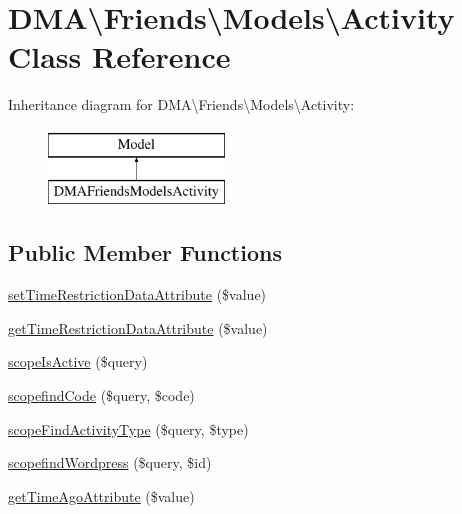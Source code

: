 \hypertarget{classDMA_1_1Friends_1_1Models_1_1Activity}{}\section{D\+M\+A\textbackslash{}Friends\textbackslash{}Models\textbackslash{}Activity Class Reference}
\label{classDMA_1_1Friends_1_1Models_1_1Activity}
Inheritance diagram for D\+M\+A\textbackslash{}Friends\textbackslash{}Models\textbackslash{}Activity\+:\begin{figure}[H]
\begin{center}
\leavevmode
\includegraphics[height=2.000000cm]{dc/d8c/classDMA_1_1Friends_1_1Models_1_1Activity}
\end{center}
\end{figure}
\subsection*{Public Member Functions}
\begin{DoxyCompactItemize}
\item 
\hyperlink{classDMA_1_1Friends_1_1Models_1_1Activity_ade0ffca24448c217def365d104e52866}{set\+Time\+Restriction\+Data\+Attribute} (\$value)
\item 
\hyperlink{classDMA_1_1Friends_1_1Models_1_1Activity_a98a904c739aca30f2a26152a481164b6}{get\+Time\+Restriction\+Data\+Attribute} (\$value)
\item 
\hyperlink{classDMA_1_1Friends_1_1Models_1_1Activity_acd3f12824d95be07b5221cdc9d64abf7}{scope\+Is\+Active} (\$query)
\item 
\hyperlink{classDMA_1_1Friends_1_1Models_1_1Activity_a9bb36aab36ff22a29b2a594617dd591c}{scopefind\+Code} (\$query, \$code)
\item 
\hyperlink{classDMA_1_1Friends_1_1Models_1_1Activity_aa17825817b73d3073e37d5e2c0933003}{scope\+Find\+Activity\+Type} (\$query, \$type)
\item 
\hyperlink{classDMA_1_1Friends_1_1Models_1_1Activity_a5a533a3f638f99d1dd0a8e0550def49e}{scopefind\+Wordpress} (\$query, \$id)
\item 
\hyperlink{classDMA_1_1Friends_1_1Models_1_1Activity_a03415578b3f688ecd26d27d9254d23ab}{get\+Time\+Ago\+Attribute} (\$value)
\end{DoxyCompactItemize}
